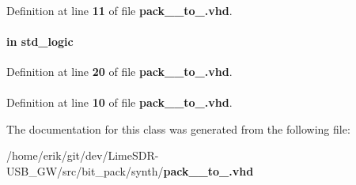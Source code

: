 \paragraph[{numeric\+\_\+std}]{\hspace{0.3cm}{\ttfamily [Package]}}\label{classpack__48__to__64_a2edc34402b573437d5f25fa90ba4013e}


Definition at line {\bf 11} of file {\bf pack\+\_\+\_\+to\+\_.\+vhd}.

\paragraph[{reset\+\_\+n}]{ {\bfseries \textcolor{keywordflow}{in}\textcolor{vhdlchar}{ }} {\bfseries \textcolor{comment}{std\+\_\+logic}\textcolor{vhdlchar}{ }} \hspace{0.3cm}{\ttfamily [Port]}}\label{classpack__48__to__64_a446ea52ed8c4a84181a47d9165ce41a5}


Definition at line {\bf 20} of file {\bf pack\+\_\+\_\+to\+\_.\+vhd}.

\paragraph[{std\+\_\+logic\+\_\+1164}]{\hspace{0.3cm}{\ttfamily [Package]}}\label{classpack__48__to__64_acd03516902501cd1c7296a98e22c6fcb}


Definition at line {\bf 10} of file {\bf pack\+\_\+\_\+to\+\_.\+vhd}.



The documentation for this class was generated from the following file\+:\begin{DoxyCompactItemize}
\item 
/home/erik/git/dev/\+Lime\+S\+D\+R-\/\+U\+S\+B\+\_\+\+G\+W/src/bit\+\_\+pack/synth/{\bf pack\+\_\+\_\+to\+\_.\+vhd}\end{DoxyCompactItemize}
